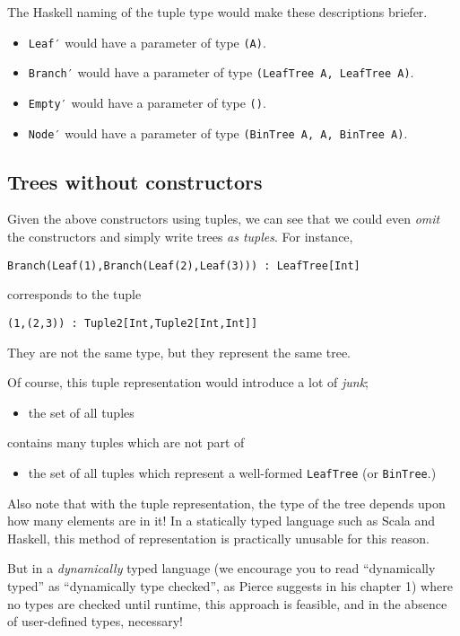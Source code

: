 \documentclass[11pt]{article}
\begin{document}
The Haskell naming of the tuple type would make
these descriptions briefer.
\begin{itemize}
\item \texttt{Leaf′} would have a parameter of type \texttt{(A)}.
\item \texttt{Branch′} would have a parameter of type \texttt{(LeafTree A, LeafTree A)}.
\item \texttt{Empty′} would have a parameter of type \texttt{()}.
\item \texttt{Node′} would have a parameter of  type \texttt{(BinTree A, A, BinTree A)}.
\end{itemize}

\subsection{Trees without constructors}
\label{sec:org0744ed6}
Given the above constructors using tuples,
we can see that we could even \emph{omit} the constructors
and simply write trees \emph{as tuples}. For instance,
\begin{verbatim}
Branch(Leaf(1),Branch(Leaf(2),Leaf(3))) : LeafTree[Int]
\end{verbatim}
corresponds to the tuple
\begin{verbatim}
(1,(2,3)) : Tuple2[Int,Tuple2[Int,Int]]
\end{verbatim}
They are not the same type, but they represent the same tree.

Of course, this tuple representation would introduce a lot of \emph{junk};
\begin{itemize}
\item the set of all tuples
\end{itemize}
contains many tuples which are not part of
\begin{itemize}
\item the set of all tuples
which represent a well-formed \texttt{LeafTree} (or \texttt{BinTree}.)
\end{itemize}

Also note that with the tuple representation,
the type of the tree depends upon how many elements are in it!
In a statically typed language such as Scala and Haskell,
this method of representation is practically unusable
for this reason.

But in a \emph{dynamically} typed language
(we encourage you to read “dynamically typed” as
“dynamically type checked”, as Pierce suggests in his chapter 1)
where no types are checked until runtime,
this approach is feasible,
and in the absence of user-defined types, necessary!
\end{document}
